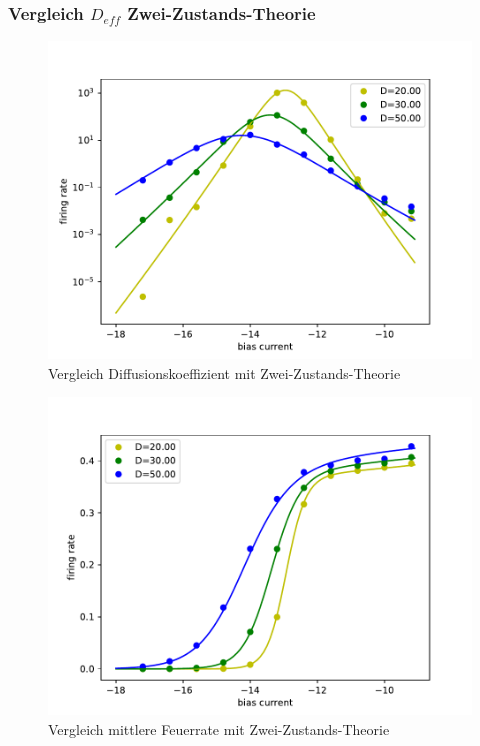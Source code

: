 \documentclass[12pt,a4paper]{article}
\begin{document}
\subsubsection{Vergleich $D_{eff}$ Zwei-Zustands-Theorie}
\begin{figure}[H]
	\centering
	\includegraphics[scale=1]{dcomprate25o6j.pdf}\caption{Vergleich Diffusionskoeffizient mit Zwei-Zustands-Theorie}
	\label{dcompraterinzel}
\end{figure}
\begin{figure}[H]
	\centering
	\includegraphics[scale=1]{gcomprate25o6jnolog.pdf}\caption{Vergleich mittlere Feuerrate mit Zwei-Zustands-Theorie}
	\label{gcompraterinzel}
\end{figure}
\end{document}
